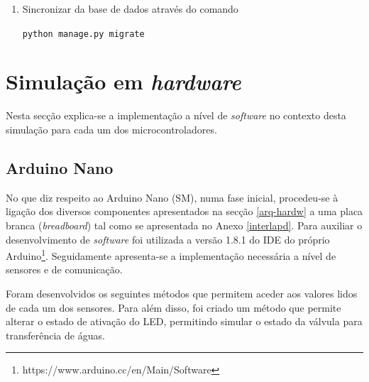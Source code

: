 \begin{enumerate}
	
	\item Sincronizar da base de dados através do comando 
	
	\texttt{python manage.py migrate}
	
	 
	 
	 
\end{enumerate}













\section{Simulação em \textit{hardware}}

Nesta secção explica-se a implementação a nível de \textit{software} no contexto desta simulação para cada um dos microcontroladores. 


\subsection{Arduino Nano}
\label{arduinonanoard}

No que diz respeito ao Arduino Nano (\acl{SM}), numa fase inicial,  procedeu-se à ligação dos diversos componentes  apresentados na secção \ref{arq-hardw} a uma placa branca (\textit{breadboard}) tal como se apresentada no Anexo \ref{interlapd}. Para auxiliar o desenvolvimento de \textit{software} foi utilizada a versão 1.8.1 do \ac{IDE} do próprio Arduino\footnote{https://www.arduino.cc/en/Main/Software}. Seguidamente apresenta-se a implementação necessária a nível de sensores e de comunicação. 


Foram desenvolvidos os seguintes métodos que permitem aceder aos valores lidos de cada um dos sensores. Para além disso, foi criado um método que permite alterar o estado de ativação do \ac{LED}, permitindo simular o estado da válvula para transferência de águas. 

